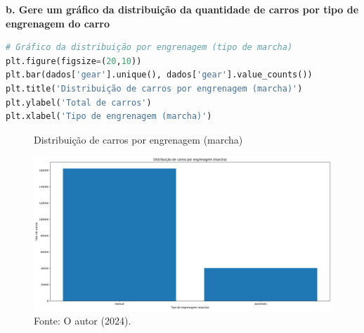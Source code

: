 \begin{adjustwidth}{1em}{}
\textbf{b. Gere um gráfico da distribuição da quantidade de carros por tipo de engrenagem do carro}
\end{adjustwidth}
\begin{lstlisting}[language=Python, style=input]
# Gráfico da distribuição por engrenagem (tipo de marcha)
plt.figure(figsize=(20,10)) 
plt.bar(dados['gear'].unique(), dados['gear'].value_counts()) 
plt.title('Distribuição de carros por engrenagem (marcha)') 
plt.ylabel('Total de carros') 
plt.xlabel('Tipo de engrenagem (marcha)') 
\end{lstlisting}
\begin{figure}[H]
\centering
\caption{Distribuição de carros por engrenagem (marcha)}
\includegraphics[width=1\linewidth]{apendices/fig/2_IAA002_2.png}
\caption*{Fonte: O autor (2024).}
\end{figure}

